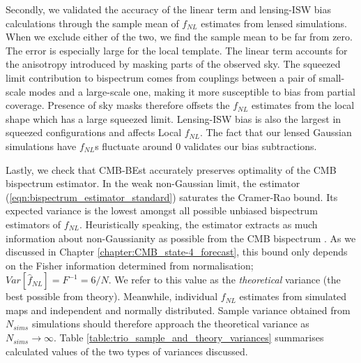 Secondly, we validated the accuracy of the linear term and lensing-ISW bias calculations through the sample mean of $f_{NL}$ estimates from lensed simulations. When we exclude either of the two, we find the sample mean to be far from zero. The error is especially large for the local template. The linear term accounts for the anisotropy introduced by masking parts of the observed sky. The squeezed limit contribution to bispectrum comes from couplings between a pair of small-scale modes and a large-scale one, making it more susceptible to bias from partial coverage. Presence of sky masks therefore offsets the $f_{NL}$ estimates from the local shape which has a large squeezed limit. Lensing-ISW bias is also the largest in squeezed configurations and affects Local $f_{NL}$. The fact that our lensed Gaussian simulations have $f_{NL}$s fluctuate around $0$ validates our bias subtractions.

Lastly, we check that CMB-BEst accurately preserves optimality of the CMB bispectrum estimator. In the weak non-Gaussian limit, the estimator (\ref{eqn:bispectrum_estimator_standard}) saturates the Cramer-Rao bound. Its expected variance is the lowest amongst all possible unbiased bispectrum estimators of $f_{NL}$. Heuristically speaking, the estimator extracts as much information about non-Gaussianity as possible from the CMB bispectrum . As we discussed in Chapter \ref{chapter:CMB_state-4_forecast}, this bound only depends on the Fisher information determined from normalisation; $Var[\hat{f}_{NL}]=F^{-1}=6/N$. We refer to this value as the \textit{theoretical} variance (the best possible from theory). Meanwhile, individual $f_{NL}$ estimates from simulated maps and independent and normally distributed. Sample variance obtained from $N_{sims}$ simulations should therefore approach the theoretical variance as $N_{sims}\rightarrow\infty$. Table \ref{table:trio_sample_and_theory_variances} summarises calculated values of the two types of variances discussed.

